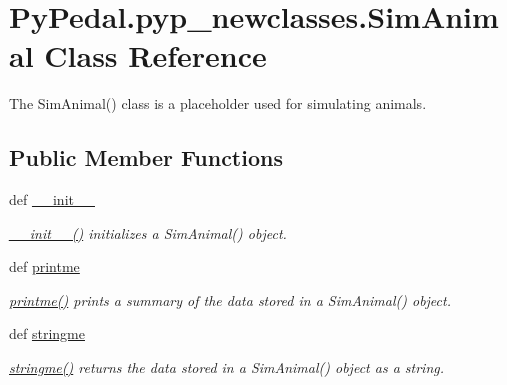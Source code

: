 \hypertarget{classPyPedal_1_1pyp__newclasses_1_1SimAnimal}{
\section{PyPedal.pyp\_\-newclasses.SimAnimal Class Reference}
\label{classPyPedal_1_1pyp__newclasses_1_1SimAnimal}
}


The SimAnimal() class is a placeholder used for simulating animals.  


\subsection*{Public Member Functions}
\begin{DoxyCompactItemize}
\item 
def \hyperlink{classPyPedal_1_1pyp__newclasses_1_1SimAnimal_a58e20d33884ff39a527a16ddaa2b2942}{\_\-\_\-init\_\-\_\-}
\begin{DoxyCompactList}\small\item\em \hyperlink{classPyPedal_1_1pyp__newclasses_1_1SimAnimal_a58e20d33884ff39a527a16ddaa2b2942}{\_\-\_\-init\_\-\_\-()} initializes a SimAnimal() object. \item\end{DoxyCompactList}\item 
def \hyperlink{classPyPedal_1_1pyp__newclasses_1_1SimAnimal_aa8fd08d0ea72c11691a96b3476c6499d}{printme}
\begin{DoxyCompactList}\small\item\em \hyperlink{classPyPedal_1_1pyp__newclasses_1_1SimAnimal_aa8fd08d0ea72c11691a96b3476c6499d}{printme()} prints a summary of the data stored in a SimAnimal() object. \item\end{DoxyCompactList}\item 
def \hyperlink{classPyPedal_1_1pyp__newclasses_1_1SimAnimal_a7be8292fd4f0713e344461670ca6c47b}{stringme}
\begin{DoxyCompactList}\small\item\em \hyperlink{classPyPedal_1_1pyp__newclasses_1_1SimAnimal_a7be8292fd4f0713e344461670ca6c47b}{stringme()} returns the data stored in a SimAnimal() object as a string. \item\end{DoxyCompactList}\end{DoxyCompactItemize}
